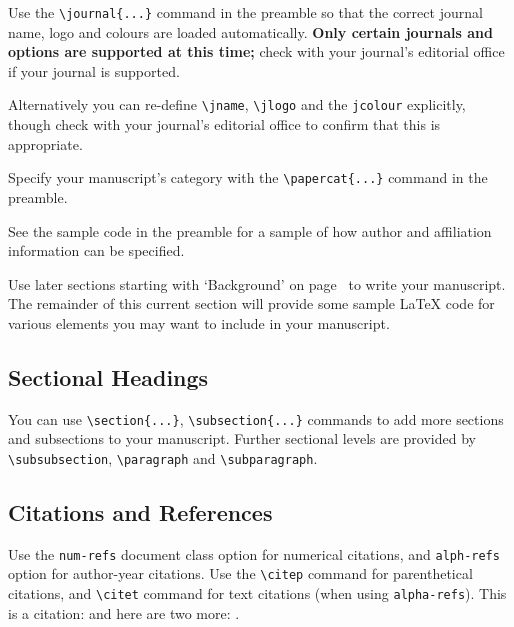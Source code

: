 \documentclass[a4paper,num-refs]{oup-contemporary}
\begin{document}
Use the \verb|\journal{...}| command in the preamble so that the correct journal name, logo and colours are loaded automatically. \textbf{Only certain journals and options are supported at this time;} check with your journal's editorial office if your journal is supported.

Alternatively you can re-define \verb|\jname|, \verb|\jlogo| and the \verb|jcolour| explicitly, though check with your journal's editorial office to confirm that this is appropriate.

Specify your manuscript's category with the \verb|\papercat{...}| command in the preamble.

See the sample code in the preamble for a sample of how author and affiliation information can be specified.

Use later sections starting with `Background' on page~\pageref{sec:background} to write your manuscript. The remainder of this current section will provide some sample \LaTeX{} code for various elements you may want to include in your manuscript.

\subsection{Sectional Headings}
You can use \verb|\section{...}|, \verb|\subsection{...}| commands to add more sections and subsections to your manuscript. Further sectional levels are provided by \verb|\subsubsection|, \verb|\paragraph| and \verb|\subparagraph|.

\subsection{Citations and References}
Use the \verb|num-refs| document class option for numerical citations, and \verb|alph-refs| option for author-year citations.
Use the \verb|\citep| command for parenthetical citations, and \verb|\citet| command for text citations (when using \verb|alpha-refs|).
This is a citation: \citep{Fan:2004} and here are two more: \citep{Cox:1972,Hear:Holm:Step:quan:2006}.
\end{document}
